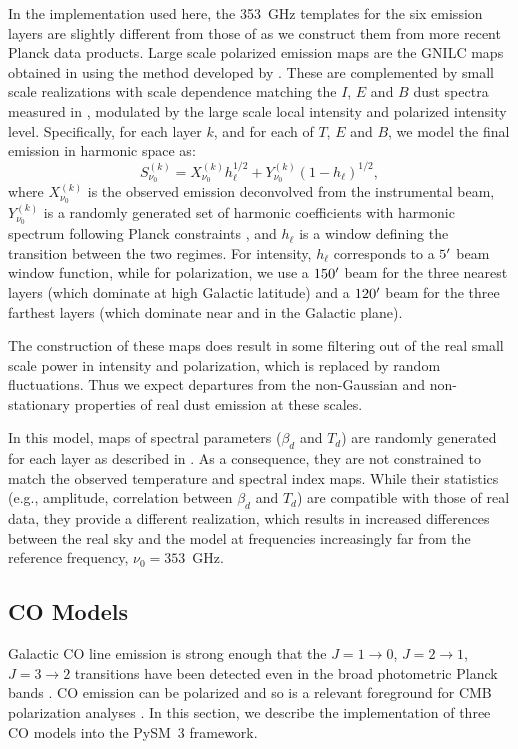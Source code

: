\documentclass[twocolumn]{aastex631}
\begin{document}
In the implementation used here, the 353~GHz templates for the six emission layers are slightly different from those of \cite{Martinez-Solaeche:2018} as we construct them from more recent Planck data products. Large scale polarized emission maps are the GNILC maps obtained in \cite{planck2016-l04} using the method developed by \cite{Remazeilles:2011}. These are complemented by small scale realizations with scale dependence matching the $I$, $E$ and $B$ dust spectra measured in \cite{planck2016-l11A}, modulated by the large scale local intensity and polarized intensity level. Specifically, for each layer $k$, and for each of $T$, $E$ and $B$, we model the final emission in harmonic space as:
\begin{equation}
    S^{(k)}_{\nu_0} = X^{(k)}_{\nu_0} h_\ell^{1/2} + Y^{(k)}_{\nu_0} (1-h_\ell)^{1/2},
\end{equation}
where $X^{(k)}_{\nu_0}$ is the observed emission deconvolved from the instrumental beam, $Y^{(k)}_{\nu_0}$ is a randomly generated set of harmonic coefficients with harmonic spectrum following Planck constraints \citep{planck2016-l11A}, and $h_\ell$ is a window defining the transition between the two regimes. For intensity, $h_\ell$ corresponds to a $5\mbox{$^\prime$}$ beam window function, while for polarization, we use a $150\mbox{$^\prime$}$ beam for the three nearest layers (which dominate at high Galactic latitude) and a $120\mbox{$^\prime$}$ beam for the three farthest layers (which dominate near and in the Galactic plane).

The construction of these maps does result in some filtering out of the real small scale power in intensity and polarization, which is replaced by random fluctuations. Thus we expect departures from the non-Gaussian and non-stationary properties of real dust emission at these scales.

In this model, maps of spectral parameters ($\beta_d$ and $T_d$) are randomly generated for each layer as described in \cite{Martinez-Solaeche:2018}. As a consequence, they are not constrained to match the observed temperature and spectral index maps. While their statistics (e.g., amplitude, correlation between $\beta_d$ and $T_d$) are compatible with those of real data, they provide a different realization, which results in increased differences between the real sky and the model at frequencies increasingly far from the reference frequency, $\nu_0 = 353$~GHz.

\subsection{CO Models} \label{subsec:co_models}
Galactic CO line emission is strong enough that the $J = 1\rightarrow0$, $J = 2\rightarrow1$, $J = 3\rightarrow2$ transitions have been detected even in the broad photometric Planck bands \citep{planck2013-p03a, planck2014-a12}. CO emission can be polarized \citep{Goldreich:1981} and so is a relevant foreground for CMB polarization analyses \citep{Puglisi:2017}. In this section, we describe the implementation of three CO models into the PySM~3 framework.
\end{document}
